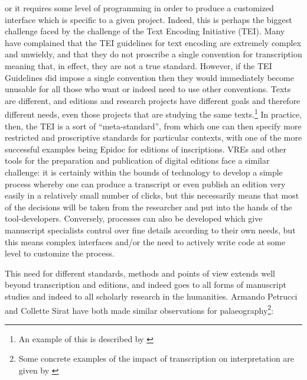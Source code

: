 or it requires some level of programming in order to produce a customized
interface which is specific to a given project. Indeed, this is perhaps the
biggest challenge faced by the challenge of the Text Encoding Initiative (TEI).
Many have complained that the TEI guidelines for text encoding are extremely
complex and unwieldy, and that they do not proscribe a single convention for
transcription meaning that, in effect, they are not a true standard. However,
if the TEI Guidelines did impose a single convention then they would
immediately become unusable for all those who want or indeed need to use other
conventions. Texts are different, and editions and research projects have
different goals and therefore different needs, even those projects that are
studying the same texts.\footnote{An example of this is described by
\cite{stokes2010project}}  In practice, then, the TEI is a sort of
“meta-standard”, from which one can then specify more restricted and
proscriptive standards for particular contexts, with one of the more successful
examples being Epidoc for editions of inscriptions.\cite{epidoc} VREs and other
tools for the preparation and publication of digital editions face a similar
challenge: it is certainly within the bounds of technology to develop a simple
process whereby one can produce a transcript or even publish an edition very
easily in a relatively small number of clicks, but this necessarily means that
most of the decisions will be taken from the researcher and put into the hands
of the tool-developers. Conversely, processes can also be developed which give
manuscript specialists control over fine details according to their own needs,
but this means complex interfaces and/or the need to actively write code at
some level to customize the process.

This need for different standards, methods and points of view extends well
beyond transcription and editions, and indeed goes to all forms of manuscript
studies and indeed to all scholarly research in the humanities.  Armando
Petrucci and Collette Sirat have both made similar observations for
palaeography\footnote{Some concrete examples of the impact of transcription on
interpretation are given by \cite[pg. 50-54]{stokes2020b}}:

